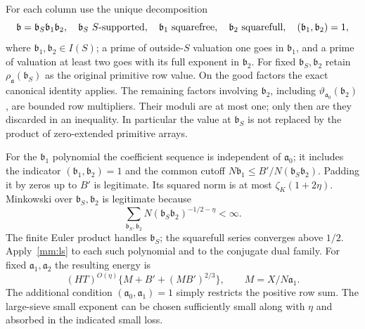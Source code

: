 \documentclass[11pt]{article}
\theoremstyle{definition}\newtheorem{definition}[theorem]{Definition}
\theoremstyle{remark}\newtheorem{remark}[theorem]{Remark}
\begin{document}
For each column use the unique decomposition
\[
 \mathfrak b=\mathfrak b_S\mathfrak b_1\mathfrak b_2,
 \quad \mathfrak b_S\ S\hbox{-supported},\quad
 \mathfrak b_1\ \hbox{squarefree},\quad
 \mathfrak b_2\ \hbox{squarefull},\quad
 (\mathfrak b_1,\mathfrak b_2)=1,
\]
where $\mathfrak b_1,\mathfrak b_2\in I(S)$; a prime of outside-$S$
valuation one goes in $\mathfrak b_1$, and a prime of valuation at least
two goes with its full exponent in $\mathfrak b_2$. For fixed
$\mathfrak b_S,\mathfrak b_2$ retain
$\rho_{\mathfrak a}(\mathfrak b_S)$ as the original primitive row
value. On the good factors the exact canonical identity applies.
The remaining factors involving $\mathfrak b_2$, including
$\vartheta_{\mathfrak a_0}(\mathfrak b_2)$, are bounded row
multipliers. Their moduli are at most one; only then are they discarded
in an inequality. In particular the value at $\mathfrak b_S$ is not
replaced by the product of zero-extended primitive arrays.

For the $\mathfrak b_1$ polynomial the coefficient sequence is
independent of $\mathfrak a_0$; it includes the indicator
$(\mathfrak b_1,\mathfrak b_2)=1$ and the common cutoff
$N\mathfrak b_1\le B'/N(\mathfrak b_S\mathfrak b_2)$.
Padding it by zeros up to $B'$ is legitimate. Its squared norm is at most
$\zeta_K(1+2\eta)$. Minkowski over $\mathfrak b_S,\mathfrak b_2$
is legitimate because
\[
 \sum_{\mathfrak b_S,\mathfrak b_2}
       N(\mathfrak b_S\mathfrak b_2)^{-1/2-\eta}<\infty.
\]
The finite Euler product handles $\mathfrak b_S$; the squarefull series
converges above $1/2$. Apply~\eqref{mm:ls} to each such polynomial and
to the conjugate dual family. For fixed $\mathfrak a_1,\mathfrak a_2$
the resulting energy is
\begin{equation}\label{mm:block-energy}
 (HT)^{O(\eta)}\{M+B'+(MB')^{2/3}\},\qquad
 M=X/N\mathfrak a_1.
\end{equation}
The additional condition $(\mathfrak a_0,\mathfrak a_1)=1$ simply
restricts the positive row sum. The large-sieve small exponent can be
chosen sufficiently small along with $\eta$ and absorbed in the
indicated small loss.
\end{document}
